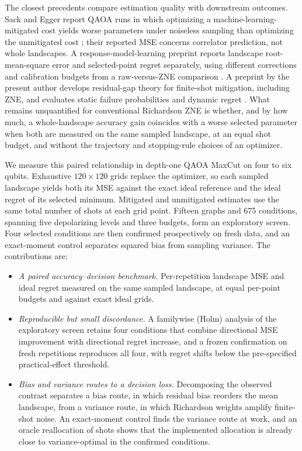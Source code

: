 The closest precedents compare estimation quality with downstream outcomes. Sack and Egger report QAOA runs in which optimizing a machine-learning-mitigated cost yields worse parameters under noiseless sampling than optimizing the unmitigated cost \citep{SackEgger2024MLMitigation}; their reported MSE concerns correlator prediction, not whole landscapes. A response-model-learning preprint reports landscape root-mean-square error and selected-point regret separately, using different corrections and calibration budgets from a raw-versus-ZNE comparison \citep{Khaleghian2026QAOAReliability}. A preprint by the present author develops residual-gap theory for finite-shot mitigation, including ZNE, and evaluates static failure probabilities and dynamic regret \citep{Scavino2026DecisionKernels}. What remains unquantified for conventional Richardson ZNE is whether, and by how much, a whole-landscape accuracy gain coincides with a worse selected parameter when both are measured on the same sampled landscape, at an equal shot budget, and without the trajectory and stopping-rule choices of an optimizer.

We measure this paired relationship in depth-one QAOA MaxCut on four to six qubits. Exhaustive $120\times120$ grids replace the optimizer, so each sampled landscape yields both its MSE against the exact ideal reference and the ideal regret of its selected minimum. Mitigated and unmitigated estimates use the same total number of shots at each grid point. Fifteen graphs and 675 conditions, spanning five depolarizing levels and three budgets, form an exploratory screen. Four selected conditions are then confirmed prospectively on fresh data, and an exact-moment control separates squared bias from sampling variance. The contributions are:
\begin{itemize}
\item \emph{A paired accuracy--decision benchmark.} Per-repetition landscape MSE and ideal regret measured on the same sampled landscape, at equal per-point budgets and against exact ideal grids.
\item \emph{Reproducible but small discordance.} A familywise (Holm) analysis of the exploratory screen retains four conditions that combine directional MSE improvement with directional regret increase, and a frozen confirmation on fresh repetitions reproduces all four, with regret shifts below the pre-specified practical-effect threshold.
\item \emph{Bias and variance routes to a decision loss.} Decomposing the observed contrast separates a bias route, in which residual bias reorders the mean landscape, from a variance route, in which Richardson weights amplify finite-shot noise. An exact-moment control finds the variance route at work, and an oracle reallocation of shots shows that the implemented allocation is already close to variance-optimal in the confirmed conditions.
\end{itemize}

